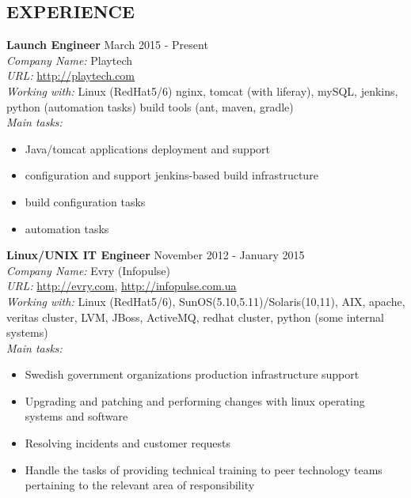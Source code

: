 \documentclass[mymargin,10pt]{res} %
\begin{document}
\begin{resume}
 
\section{EXPERIENCE}

{\bf Launch Engineer} \hfill March 2015 - Present \\
{\sl Company Name:} Playtech \\
{\sl URL:} \url{http://playtech.com} \\
{\sl Working with:} Linux (RedHat5/6) nginx, tomcat (with liferay), mySQL, jenkins, python (automation tasks) build tools (ant, maven, gradle) \\
{\sl Main tasks:}
\begin{itemize}
\item Java/tomcat applications deployment and support
\item configuration and support jenkins-based build infrastructure
\item build configuration tasks
\item automation tasks
\end{itemize}

{\bf Linux/UNIX IT Engineer} \hfill November 2012 - January 2015 \\
{\sl Company Name:} Evry (Infopulse) \\
{\sl URL:} \url{http://evry.com}, \url{http://infopulse.com.ua} \\
{\sl Working with:} Linux (RedHat5/6), SunOS(5.10,5.11)/Solaris(10,11), AIX, apache, veritas cluster, LVM,
JBoss, ActiveMQ, redhat cluster, python (some internal systems) \\
{\sl Main tasks:}
\begin{itemize}
\item Swedish government organizations production infrastructure support
\item Upgrading and patching and performing changes with linux operating systems and software
\item Resolving incidents and customer requests
\item Handle the tasks of providing technical training to peer technology teams pertaining to the
  relevant area of responsibility
\end{itemize}



\end{resume}
\end{document}
